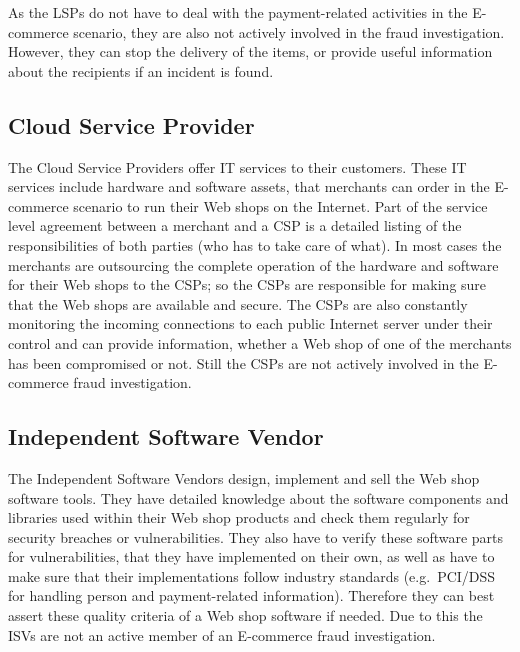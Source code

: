 As the \gls{LSP}s do not have to deal with the payment-related activities in the \gls{E-commerce} scenario, they are also not actively involved in the fraud investigation. However, they can stop the delivery of the items, or provide useful information about the recipients if an incident is found.


\subsection{Cloud Service Provider}
\label{subsec:stakeholder_csp}

The Cloud Service Providers offer \gls{IT} services to their customers. These \gls{IT} services include hardware and software assets, that merchants can order in the \gls{E-commerce} scenario to run their Web shops on the Internet. Part of the service level agreement between a merchant and a \gls{CSP} is a detailed listing of the responsibilities of both parties (who has to take care of what). In most cases the merchants are outsourcing the complete operation of the hardware and software for their Web shops to the \gls{CSP}s; so the \gls{CSP}s are responsible for making sure that the Web shops are available and secure. The \gls{CSP}s are also constantly monitoring the incoming connections to each public Internet server under their control and can provide information, whether a Web shop of one of the merchants has been compromised or not. Still the \gls{CSP}s are not actively involved in the \gls{E-commerce} fraud investigation.


\subsection{Independent Software Vendor}
\label{subsec:stakeholder_isv}

The Independent Software Vendors design, implement and sell the Web shop software tools. They have detailed knowledge about the software components and libraries used within their Web shop products and check them regularly for security breaches or vulnerabilities. They also have to verify these software parts for vulnerabilities, that they have implemented on their own, as well as have to make sure that their implementations follow industry standards (e.g.\ \gls{PCI/DSS} for handling person and payment-related information). Therefore they can best assert these quality criteria of a Web shop software if needed. Due to this the \gls{ISV}s are not an active member of an \gls{E-commerce} fraud investigation.

